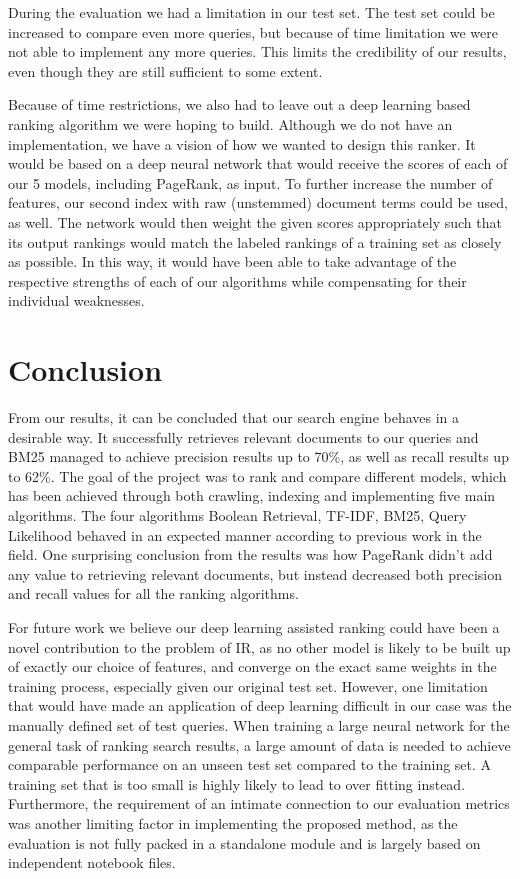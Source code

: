During the evaluation we had a limitation in our test set. The test set could be increased to compare even more queries, but because of time limitation we were not able to implement any more queries. This limits the credibility of our results, even though they are still sufficient to some extent.

Because of time restrictions, we also had to leave out a deep learning based ranking algorithm we were hoping to build. Although we do not have an implementation, we have a vision of how we wanted to design this ranker. It would be based on a deep neural network that would receive the scores of each of our 5 models, including PageRank, as input. To further increase the number of features, our second index with raw (unstemmed) document terms could be used, as well. The network would then weight the given scores appropriately such that its output rankings would match the labeled rankings of a training set as closely as possible. In this way, it would have been able to take advantage of the respective strengths of each of our algorithms while compensating for their individual weaknesses.


\section{Conclusion} %
\label{sec:conclusion}

From our results, it can be concluded that our search engine behaves in a desirable way. It successfully retrieves relevant documents to our queries and BM25 managed to achieve precision results up to 70\%, as well as recall results up to 62\%. The goal of the project was to rank and compare different models, which has been achieved through both crawling, indexing and implementing five main algorithms. The four algorithms Boolean Retrieval, TF-IDF, BM25, Query Likelihood behaved in an expected manner according to previous work in the field. One surprising conclusion from the results was how PageRank didn't add any value to retrieving relevant documents, but instead decreased both precision and recall values for all the ranking algorithms. 

For future work we believe our deep learning assisted ranking could have been a novel contribution to the problem of IR, as no other model is likely to be built up of exactly our choice of features, and converge on the exact same weights in the training process, especially given our original test set. However, one limitation that would have made an application of deep learning difficult in our case was the manually defined set of test queries. When training a large neural network for the general task of ranking search results, a large amount of data is needed to achieve comparable performance on an unseen test set compared to the training set. A training set that is too small is highly likely to lead to over fitting instead. Furthermore, the requirement of an intimate connection to our evaluation metrics was another limiting factor in implementing the proposed method, as the evaluation is not fully packed in a standalone module and is largely based on independent notebook files.





